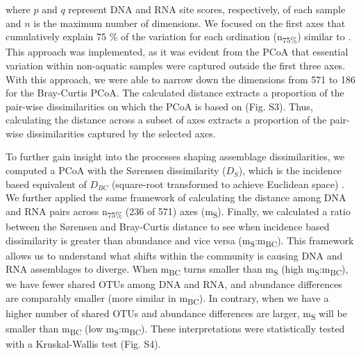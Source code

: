 \documentclass[12pt,a4paper]{article} %
\begin{document}
where $p$ and $q$ represent DNA and RNA site scores, respectively, of each sample and $n$ is the maximum number of dimensions. We focused on the first axes that cumulatively explain 75 \% of the variation for each ordination (n\textsubscript{75\%}) similar to \citet{Osterholz2016}. This approach was implemented, as it was evident from the PCoA that essential variation within non-aquatic samples were captured outside the first three axes. With this approach, we were able to narrow down the dimensions from 571 to 186 for the Bray-Curtis PCoA. The calculated distance extracts a proportion of the pair-wise dissimilarities on which the PCoA is based on (Fig. S3). Thus, calculating the distance across a subset of axes extracts a proportion of the pair-wise dissimilarities captured by the selected axes.

To further gain insight into the processes shaping assemblage dissimilarities, we computed a PCoA with the S{\o}rensen dissimilarity ($D_{S}$), which is the incidence based equivalent of $D_{BC}$ (square-root transformed to achieve Euclidean space) \citep{Sorensen1948, Legendre1998}. We further applied the same framework of calculating the distance among DNA and RNA pairs across n\textsubscript{75\%} (236 of 571) axes (m\textsubscript{S}). Finally, we calculated a ratio between the S{\o}rensen and Bray-Curtis distance to see when incidence based dissimilarity is greater than abundance and vice versa (m\textsubscript{S}:m\textsubscript{BC}). This framework allows us to understand what shifts within the community is causing DNA and RNA assemblages to diverge. When m\textsubscript{BC} turns smaller than m\textsubscript{S} (high m\textsubscript{S}:m\textsubscript{BC}), we have fewer shared OTUs among DNA and RNA, and abundance differences are comparably smaller (more similar in m\textsubscript{BC}). In contrary, when we have a higher number of shared OTUs and abundance differences are larger, m\textsubscript{S} will be smaller than m\textsubscript{BC} (low m\textsubscript{S}:m\textsubscript{BC}). These interpretations were statistically tested with a Kruskal-Wallis test (Fig. S4).

\end{document}

